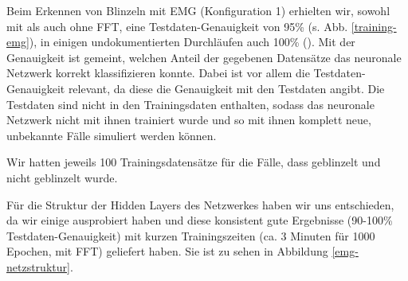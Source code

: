 \documentclass[11pt]{scrartcl}
\begin{document}
	Beim Erkennen von Blinzeln mit EMG (Konfiguration 1) erhielten wir, sowohl mit als auch ohne FFT, eine Testdaten-Genauigkeit von 95\% (s. Abb. \ref{training-emg}), in einigen undokumentierten Durchläufen auch 100\% (). Mit der Genauigkeit ist gemeint, welchen Anteil der gegebenen Datensätze das neuronale Netzwerk korrekt klassifizieren konnte. Dabei ist vor allem die Testdaten-Genauigkeit relevant, da diese die Genauigkeit mit den Testdaten angibt. Die Testdaten sind nicht in den Trainingsdaten enthalten, sodass das neuronale Netzwerk nicht mit ihnen trainiert wurde und so mit ihnen komplett neue, unbekannte Fälle simuliert werden können.

	\begin{figure}[H]
	\end{figure}

	
	Wir hatten jeweils 100 Trainingsdatensätze für die Fälle, dass geblinzelt und nicht geblinzelt wurde.

	Für die Struktur der Hidden Layers des Netzwerkes haben wir uns entschieden, da wir einige ausprobiert haben und diese konsistent gute Ergebnisse (90-100\% Testdaten-Genauigkeit) mit kurzen Trainingszeiten (ca. 3 Minuten für 1000 Epochen, mit FFT) geliefert haben. Sie ist zu sehen in Abbildung \ref{emg-netzstruktur}.
\end{document}
